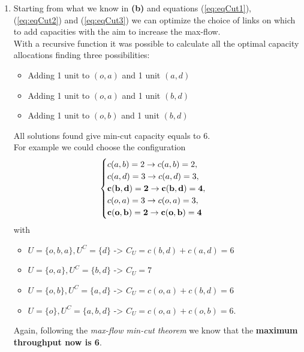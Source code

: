 \documentclass[
	12pt, %
]{fphw}
\begin{document}
\begin{enumerate}[{\bfseries (a)}]
        \item Starting from what we know in \textbf{(b)} and equations (\ref{eq:eqCut1}), (\ref{eq:eqCut2}) and (\ref{eq:eqCut3}) we can optimize the choice of links on which to add capacities with the aim to increase the max-flow.\\
        With a recursive function it was possible to calculate all the optimal capacity allocations finding three possibilities:
        \begin{itemize}
            \item Adding 1 unit to $(o,a)$ and 1 unit $(a,d)$
            \item Adding 1 unit to $(o,a)$ and 1 unit $(b,d)$
            \item Adding 1 unit to $(o,b)$ and 1 unit $(b,d)$
        \end{itemize}
        All solutions found give min-cut capacity equals to 6.\\ 
        For example we could choose the configuration 
        $$
        \begin{cases}
            c(a,b) = 2 \rightarrow c(a,b) = 2,\\
            c(a,d) = 3 \rightarrow c(a,d) = 3,\\
            \bf{c(b,d) = 2 \rightarrow c(b,d) = 4},\\
            c(o,a) = 3 \rightarrow c(o,a) = 3,\\
            \bf{c(o,b) = 2 \rightarrow c(o,b) = 4}
        \end{cases}
        $$
        with
        \begin{itemize}
            \item $U=\{o,b,a\},U^C=\{d\}$ -> $C_U = c(b,d) + c(a,d) = 6$
            \item $U=\{o,a\},U^C=\{b,d\}$ -> $C_U = 7$
            \item $U=\{o,b\},U^C=\{a,d\}$ -> $C_U = c(o,a) + c(b,d) = 6$
            \item $U=\{o\},U^C=\{a,b,d\}$ -> $C_U = c(o,a) + c(o,b) = 6$.
        \end{itemize}
        Again, following the \emph{max-flow min-cut theorem} we know that the \textbf{maximum throughput now is 6}. 
        

\end{enumerate}
\end{document}
